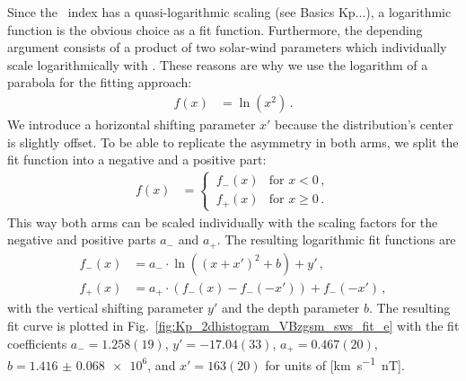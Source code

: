 Since the \Kp~index has a quasi-logarithmic scaling (see Basics Kp...), a logarithmic function is the obvious choice as a fit function. Furthermore, the depending argument consists of a product of two solar-wind parameters which individually scale logarithmically with \Kp{}. These reasons are why we use the logarithm of a parabola for the fitting approach:
\begin{align}
	f(x) &= \ln\left(x^2\right)	\,.	\label{eq:log_square_function}
\end{align}
We introduce a horizontal shifting parameter $x'$ because the distribution's center is slightly offset. To be able to replicate the asymmetry in both arms, we split the fit function into a negative and a positive part:
\begin{align}
	f(x) &=
	\begin{cases}
		\,f_-(x) &\text{for } x < 0	\,,\\
		\,f_+(x) &\text{for } x \ge 0	\,.
	\end{cases}	\label{eq:log_square_fit_function}
\end{align}
This way both arms can be scaled individually with the scaling factors for the negative and positive parts $a_-$ and $a_+$. The resulting logarithmic fit functions are
\begin{align}
	f_-(x) &= a_- \cdot \ln\left(\left(x + x'\right)^2 + b\right) + y'	\,,\\
	f_+(x) &= a_+ \cdot \left(f_-(x) - f_-\left(-x'\right)\right) + f_-\left(-x'\right)	\,,
\end{align}
with the vertical shifting parameter $y'$ and the depth parameter $b$. The resulting fit curve is plotted in Fig.~\ref{fig:Kp_2dhistogram_VBzgsm_sws_fit_e} with the fit coefficients $a_- = 1.258(19)$, $y' = -17.04(33)$, $a_+ = 0.467(20)$, $b = \num{1.416(68)e6}$, and $x' = 163(20)$ for units of [\si{\km\per\s \nano\tesla}].
\begin{figure}
\end{figure}
